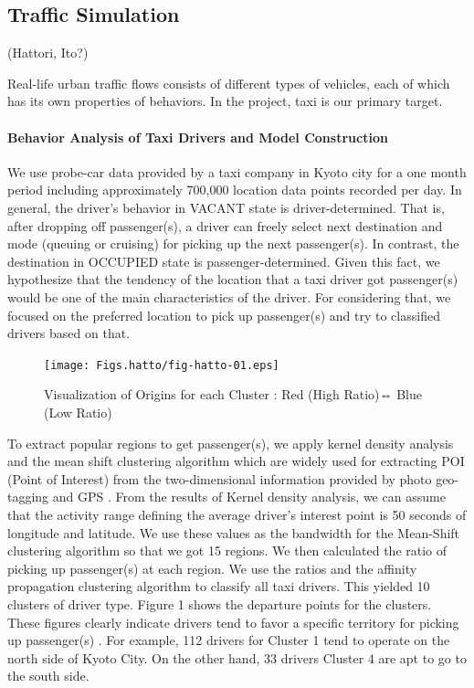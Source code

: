 \subsection{Traffic Simulation}
\label{ss:Traffic Simulation}
(Hattori, Ito?)

Real-life urban traffic flows consists of different types of vehicles, each of which has its own properties of behaviors. In the project, taxi is our primary target. 

\paragraph{Behavior Analysis of Taxi Drivers and Model Construction}
We use probe-car data provided by a taxi company in Kyoto city for a one month period including approximately 700,000 location data points recorded per day.
%
In general, the driver’s behavior in VACANT state is driver-determined. That is, after dropping off passenger(s), a driver can freely select next destination and mode (queuing or cruising) for picking up the next passenger(s). In contrast, the destination in OCCUPIED state is passenger-determined. Given this fact, we hypothesize that the tendency of the location that a taxi driver got passenger(s) would be one of the main characteristics of the driver. For considering that, we focused on the preferred location to pick up passenger(s) and try to classified drivers based on that. 

\begin{figure}
  \centering
  \texttt{[image: Figs.hatto/fig-hatto-01.eps]}
  \caption{Visualization of Origins for each Cluster : Red (High Ratio)⇔ Blue (Low Ratio)}
  \label{fig:Figs.hatto/fig-hatto-01.eps}
\end{figure}

To extract popular regions to get passenger(s), we apply kernel density analysis and the mean shift clustering algorithm which are widely used for extracting POI (Point of Interest) from the two-dimensional information provided by photo geo-tagging and GPS \cite{Crandall06a}. From the results of Kernel density analysis, we can assume that the activity range defining the average driver’s interest point is 50 seconds of longitude and latitude.  We use these values as the bandwidth for the Mean-Shift clustering algorithm so that we got 15 regions. We then calculated the ratio of picking up passenger(s) at each region. We use the ratios and the affinity propagation clustering algorithm to classify all taxi drivers. This yielded 10 clusters of driver type.
Figure 1 shows the departure points for the clusters. These figures clearly indicate drivers tend to favor a specific territory for picking up passenger(s) . For example, 112 drivers for Cluster 1 tend to operate on the north side of Kyoto City. On the other hand, 33 drivers Cluster 4 are apt to go to the south side. 

